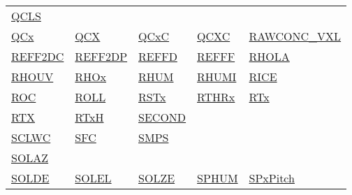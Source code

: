 \documentclass[
  english,
]{book}
\begin{document}
\begin{longtable}[]{@{}lllll@{}}
\href{/rmd_output/1/6-air-chemistry-measurements.html\#awas-cims-qcls-toga}{QCLS} & & & & \\
\href{/rmd_output/1/4-the-state-of-the-atmosphere.html\#qcx}{QCx} & \href{/rmd_output/1/4-the-state-of-the-atmosphere.html\#qcx}{QCX} & \href{/rmd_output/1/4-the-state-of-the-atmosphere.html\#qcx}{QCxC} & \href{/rmd_output/1/4-the-state-of-the-atmosphere.html\#qcx}{QCXC} & \href{/rmd_output/1/4-the-state-of-the-atmosphere.html\#vcsel-uncor}{RAWCONC\_VXL} \\
\href{/rmd_output/1/5-cloud-physics-variables.html\#reff2d}{REFF2DC} & \href{/rmd_output/1/5-cloud-physics-variables.html\#reff2d}{REFF2DP} & \href{/rmd_output/1/5-cloud-physics-variables.html\#effective-radius}{REFFD} & \href{/rmd_output/1/5-cloud-physics-variables.html\#effective-radius}{REFFF} & \href{/rmd_output/1/4-the-state-of-the-atmosphere.html\#rho}{RHOLA} \\
\href{/rmd_output/1/4-the-state-of-the-atmosphere.html\#rho}{RHOUV} & \href{/rmd_output/1/4-the-state-of-the-atmosphere.html\#rho}{RHOx} & \href{/rmd_output/1/4-the-state-of-the-atmosphere.html\#rhumw}{RHUM} & \href{/rmd_output/1/4-the-state-of-the-atmosphere.html\#rhumi}{RHUMI} & \href{/rmd_output/1/5-cloud-physics-variables.html\#rice}{RICE} \\
\href{/rmd_output/1/3-the-state-of-the-aircraft.html\#roc}{ROC} & \href{/rmd_output/1/3-the-state-of-the-aircraft.html\#roll}{ROLL} & \href{/rmd_output/1/8-radiation-variables.html\#rstx}{RSTx} & \href{/rmd_output/1/4-the-state-of-the-atmosphere.html\#recovery-t}{RTHRx} & \href{/rmd_output/1/4-the-state-of-the-atmosphere.html\#recovery-t}{RTx} \\
\href{/rmd_output/1/4-the-state-of-the-atmosphere.html\#recovery-t}{RTX} & \href{/rmd_output/1/4-the-state-of-the-atmosphere.html\#recovery-t}{RTxH} & \href{/rmd_output/1/2-general-information-about-data-files.html\#hms}{SECOND} & & \\
\href{/rmd_output/1/10-obsolete-variables.html\#sclwc}{SCLWC} & \href{/rmd_output/1/3-the-state-of-the-aircraft.html\#sfc}{SFC} & \href{/rmd_output/1/7-aerosol-particle-measurements.html\#special-aerosol}{SMPS} & & \\
\href{/rmd_output/1/8-radiation-variables.html\#solaz}{SOLAZ} & & & & \\
\href{/rmd_output/1/8-radiation-variables.html\#solde}{SOLDE} & \href{/rmd_output/1/8-radiation-variables.html\#solel}{SOLEL} & \href{/rmd_output/1/8-radiation-variables.html\#solze}{SOLZE} & \href{/rmd_output/1/4-the-state-of-the-atmosphere.html\#sphum}{SPHUM} & \href{/rmd_output/1/8-radiation-variables.html\#spx}{SPxPitch} \\

\end{longtable}
\end{document}
